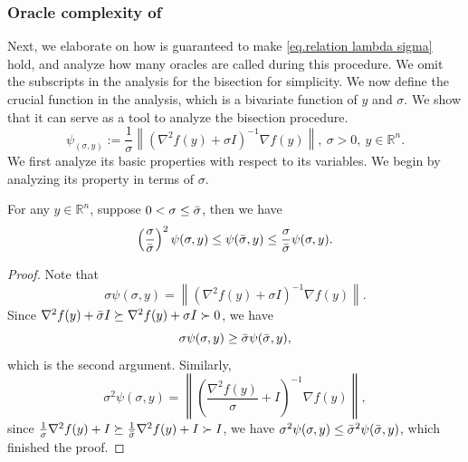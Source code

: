 \documentclass{mcom-l}
\numberwithin{equation}{section}
\begin{document}
\subsubsection{Oracle complexity of }
Next, we elaborate on how  is guaranteed to make \eqref{eq.relation lambda sigma} hold, and analyze how many oracles are called during this procedure. We omit the subscripts in the analysis for the bisection for simplicity. We now define the crucial function in the analysis, which is a bivariate function of $y$ and $\sigma$. We show that it can serve as a tool to analyze the bisection procedure.
\begin{equation}
    \label{eq.linesearch quantity}
    \psi_(\sigma,y) := \frac{1}{\sigma}\left \| \left(\nabla^2 f(y)+\sigma I \right)^{-1}\nabla f(y)\right \|, \ \sigma>0, \ y\in\mathbb{R}^n.
\end{equation}
We first analyze its basic properties with respect to its variables. We begin by analyzing its property in terms of $\sigma$.
\begin{lemma}
    \label{lem.psi property wrt sigma}
    For any $y\in\mathbb{R}^n$, suppose $0<\sigma\leq \Bar{\sigma}$, then we have
    \begin{equation}
        \label{eq.psi property wrt sigma}
        \left(\frac{\sigma}{\Bar{\sigma}}\right)^2 \psi(\sigma,y)\leq \psi(\Bar{\sigma},y) \leq \frac{\sigma}{\Bar{\sigma}}\psi(\sigma,y).
    \end{equation}
\end{lemma}
\begin{proof}
    Note that
    \begin{equation*}
        \sigma \psi(\sigma,y) = \left \| \left(\nabla^2 f(y)+\sigma I \right)^{-1}\nabla f(y)\right \|.
    \end{equation*}
    Since $\nabla^2 f(y)+\Bar{\sigma} I\succeq \nabla^2 f(y)+\sigma I \succ 0$, we have
    \begin{equation*}
        \sigma \psi(\sigma,y) \geq \Bar{\sigma} \psi(\Bar{\sigma},y),
    \end{equation*}
    which is the second argument. Similarly,
    \begin{equation*}
        \sigma^2 \psi(\sigma,y) = \left \| \left(\frac{\nabla^2 f(y)}{\sigma}+ I \right)^{-1}\nabla f(y)\right \|,
    \end{equation*}
    since $\frac{1}{\sigma}\nabla^2 f(y)+I\succeq \frac{1}{\Bar{\sigma}}\nabla^2 f(y)+I\succ I$, we have $\sigma^2 \psi(\sigma,y)\leq \Bar{\sigma}^2 \psi(\Bar{\sigma},y)$, which finished the proof.
\end{proof}
\end{document}
